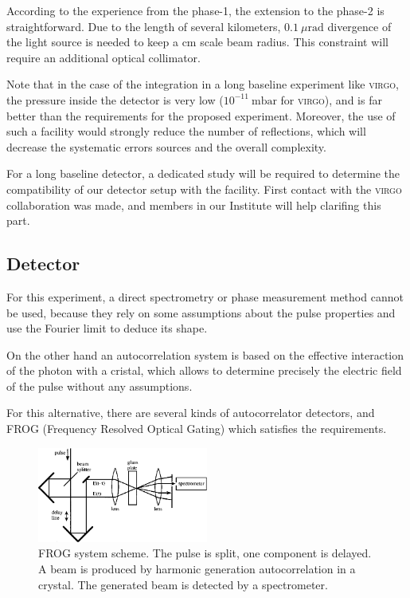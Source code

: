 \documentclass[9pt, a4, twoside]{article}
\begin{document}
According to the experience from the phase-1, the extension to the phase-2 is straightforward. Due to the length of several kilometers, $0.1~\mu\mathrm{rad}$ divergence of the light source is needed to keep a cm scale beam radius. This constraint will require an additional optical collimator.

Note that in the case of the integration in a long baseline experiment like \textsc{virgo}, the pressure inside the detector is very low ($10^{-11}~\mathrm{mbar}$ for \textsc{virgo}), and is far better than the requirements for the proposed experiment.
Moreover, the  use of such a facility would strongly reduce the number of reflections, which will decrease the systematic errors sources and the overall complexity.

For a long baseline detector, a dedicated study will be required to determine the compatibility of our detector setup with the facility. First contact with the \textsc{virgo} collaboration was made, and members in our Institute will help clarifing this part.

\subsection{Detector}
\label{sec:detector}
For this experiment, a direct spectrometry or phase measurement method cannot be used, because they rely on some assumptions about the pulse properties and use the Fourier limit to deduce its shape.

On the other hand an autocorrelation system is based on the effective interaction of the photon with a cristal, which allows to determine precisely the electric field of the pulse without any assumptions.

For this alternative, there are several kinds of autocorrelator detectors, and FROG \cite{frogref} (Frequency Resolved Optical Gating) which satisfies the requirements.

\begin{figure}[!]
\centering
\includegraphics[width=0.5\textwidth]{./img/thg_setup.png}
\caption{FROG system scheme. The pulse is split, one component is delayed. A beam is produced by harmonic generation autocorrelation in a crystal. The generated beam is detected by a spectrometer.}
\label{fig:sensiv}
\end{figure}
\end{document}
